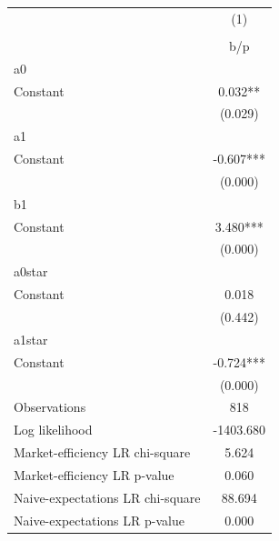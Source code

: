 {
\def\sym#1{\ifmmode^{#1}\else\(^{#1}\)\fi}
\begin{tabular}{l*{1}{c}}
\hline\hline
                    &\multicolumn{1}{c}{(1)}\\
                    &\multicolumn{1}{c}{}\\
                    &         b/p   \\
\hline
a0                  &               \\
Constant            &       0.032** \\
                    &     (0.029)   \\
\hline
a1                  &               \\
Constant            &      -0.607***\\
                    &     (0.000)   \\
\hline
b1                  &               \\
Constant            &       3.480***\\
                    &     (0.000)   \\
\hline
a0star              &               \\
Constant            &       0.018   \\
                    &     (0.442)   \\
\hline
a1star              &               \\
Constant            &      -0.724***\\
                    &     (0.000)   \\
\hline
Observations        &         818   \\
Log likelihood      &   -1403.680   \\
Market-efficiency LR chi-square&       5.624   \\
Market-efficiency LR p-value&       0.060   \\
Naive-expectations LR chi-square&      88.694   \\
Naive-expectations LR p-value&       0.000   \\
\hline\hline
\end{tabular}
}
